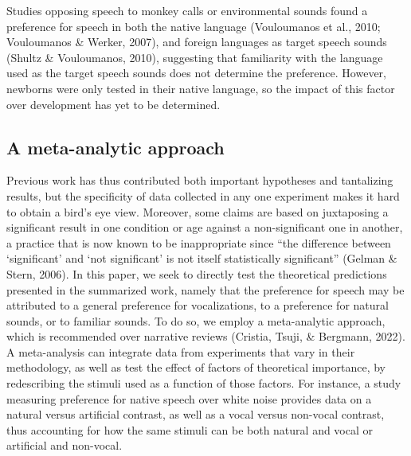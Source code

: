 \documentclass[
  man,mask,floatsintext]{apa6}
\begin{document}
Studies opposing speech to monkey calls or environmental sounds found a preference for speech in both the native language (Vouloumanos et al., 2010; Vouloumanos \& Werker, 2007), and foreign languages as target speech sounds (Shultz \& Vouloumanos, 2010), suggesting that familiarity with the language used as the target speech sounds does not determine the preference. However, newborns were only tested in their native language, so the impact of this factor over development has yet to be determined.

\hypertarget{a-meta-analytic-approach}{%
\subsection{A meta-analytic approach}\label{a-meta-analytic-approach}}

Previous work has thus contributed both important hypotheses and tantalizing results, but the specificity of data collected in any one experiment makes it hard to obtain a bird's eye view. Moreover, some claims are based on juxtaposing a significant result in one condition or age against a non-significant one in another, a practice that is now known to be inappropriate since ``the difference between `significant' and `not significant' is not itself statistically significant'' (Gelman \& Stern, 2006). In this paper, we seek to directly test the theoretical predictions presented in the summarized work, namely that the preference for speech may be attributed to a general preference for vocalizations, to a preference for natural sounds, or to familiar sounds. To do so, we employ a meta-analytic approach, which is recommended over narrative reviews (Cristia, Tsuji, \& Bergmann, 2022). A meta-analysis can integrate data from experiments that vary in their methodology, as well as test the effect of factors of theoretical importance, by redescribing the stimuli used as a function of those factors. For instance, a study measuring preference for native speech over white noise provides data on a natural versus artificial contrast, as well as a vocal versus non-vocal contrast, thus accounting for how the same stimuli can be both natural and vocal or artificial and non-vocal.
\end{document}
